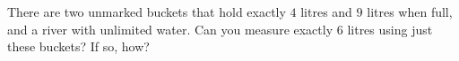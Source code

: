 There are two unmarked buckets that hold exactly $4$ litres and $9$ litres when full, and a river with unlimited water. Can you measure exactly $6$ litres using just these buckets? If so, how?
